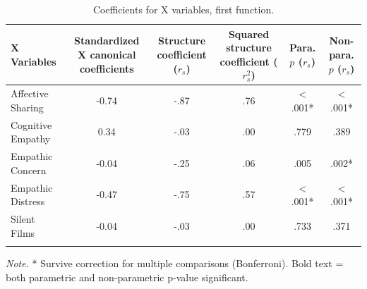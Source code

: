 \documentclass[
  english,
  man,floatsintext]{apa6}
\begin{document}
\begin{table}[tbp]

\begin{center}
\begin{threeparttable}

\caption{\label{tab:alt1_coeffxtable}Coefficients for X variables, first function.}

\small{

\begin{tabular}{lccccc}
\toprule
X Variables & Standardized X canonical coefficients & Structure coefficient ($r_{s}$) & Squared structure coefficient ($r^{2}_{s}$) & Para. $p$ ($r_{s}$) & Non-para. $p$ ($r_{s}$)\\
\midrule
Affective Sharing & -0.74 & -.87 & .76 & < .001* & < .001*\\
Cognitive Empathy & 0.34 & -.03 & .00 & .779 & .389\\
Empathic Concern & -0.04 & -.25 & .06 & .005 & .002*\\
Empathic Distress & -0.47 & -.75 & .57 & < .001* & < .001*\\
Silent Films & -0.04 & -.03 & .00 & .733 & .371\\
\bottomrule
\addlinespace
\end{tabular}

}

\begin{tablenotes}[para]
\normalsize{\textit{Note.} * Survive correction for multiple comparisons (Bonferroni). Bold text = both 
          parametric and non-parametric p-value significant.}
\end{tablenotes}

\end{threeparttable}
\end{center}

\end{table}
\end{document}
